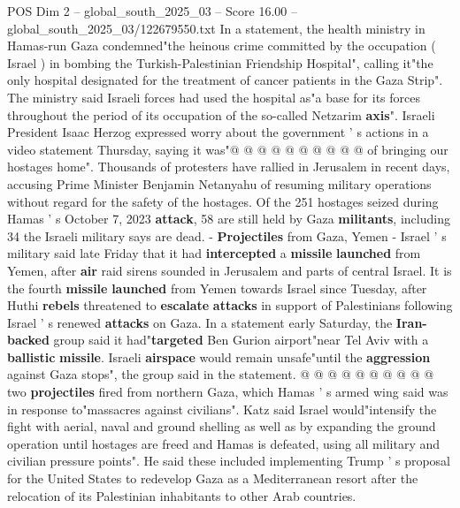 \begin{textsample}{POS Dim 2 – global\_south\_2025\_03 – Score 16.00 – global\_south\_2025\_03/122679550.txt}
In a statement, the health ministry in Hamas-run Gaza condemned"the heinous crime committed by the occupation ( Israel ) in bombing the Turkish-Palestinian Friendship Hospital", calling it"the only hospital designated for the treatment of cancer patients in the Gaza Strip".
The ministry said Israeli forces had used the hospital as"a base for its forces throughout the period of its occupation of the so-called Netzarim \textbf{axis}".
Israeli President Isaac Herzog expressed worry about the government ' s actions in a video statement Thursday, saying it was"@ @ @ @ @ @ @ @ @ @ of bringing our hostages home".
Thousands of protesters have rallied in Jerusalem in recent days, accusing Prime Minister Benjamin Netanyahu of resuming military operations without regard for the safety of the hostages.
Of the 251 hostages seized during Hamas ' s October 7, 2023 \textbf{attack}, 58 are still held by Gaza \textbf{militants}, including 34 the Israeli military says are dead. - \textbf{Projectiles} from Gaza, Yemen - Israel ' s military said late Friday that it had \textbf{intercepted} a \textbf{missile} \textbf{launched} from Yemen, after \textbf{air} raid sirens sounded in Jerusalem and parts of central Israel.
It is the fourth \textbf{missile} \textbf{launched} from Yemen towards Israel since Tuesday, after Huthi \textbf{rebels} threatened to \textbf{escalate} \textbf{attacks} in support of Palestinians following Israel ' s renewed \textbf{attacks} on Gaza.
In a statement early Saturday, the \textbf{Iran-backed} group said it had"\textbf{targeted} Ben Gurion airport"near Tel Aviv with a \textbf{ballistic} \textbf{missile}.
Israeli \textbf{airspace} would remain unsafe"until the \textbf{aggression} against Gaza stops", the group said in the statement. @ @ @ @ @ @ @ @ @ @ two \textbf{projectiles} fired from northern Gaza, which Hamas ' s armed wing said was in response to"massacres against civilians".
Katz said Israel would"intensify the fight with aerial, naval and ground shelling as well as by expanding the ground operation until hostages are freed and Hamas is defeated, using all military and civilian pressure points".
He said these included implementing Trump ' s proposal for the United States to redevelop Gaza as a Mediterranean resort after the relocation of its Palestinian inhabitants to other Arab countries.

\end{textsample}

